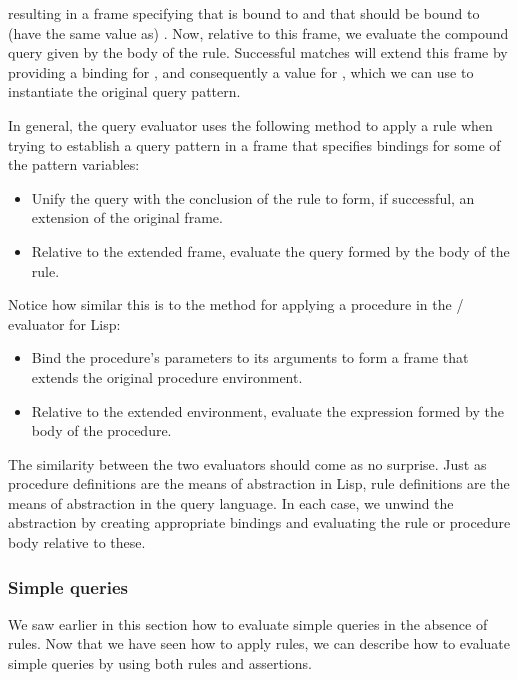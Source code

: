 \noindent
resulting in a frame specifying that  is bound to  and that  should be bound to (have the same value as)
.  Now, relative to this frame, we evaluate the compound query
given by the body of the rule.  Successful matches will extend this frame by
providing a binding for , and consequently a value for
, which we can use to instantiate the original query pattern.

In general, the query evaluator uses the following method to apply a rule when
trying to establish a query pattern in a frame that specifies bindings for some
of the pattern variables:

\begin{itemize}
\item
Unify the query with the conclusion of the rule to form, if successful, an
extension of the original frame.

\item
Relative to the extended frame, evaluate the query formed by the body of the
rule.
\end{itemize}

\noindent
Notice how similar this is to the method for applying a procedure in the
/ evaluator for Lisp:

\begin{itemize}
\item
Bind the procedure's parameters to its arguments to form a frame that extends
the original procedure environment.

\item
Relative to the extended environment, evaluate the expression formed by the
body of the procedure.
\end{itemize}

\noindent
The similarity between the two evaluators should come as no surprise.  Just as
procedure definitions are the means of abstraction in Lisp, rule definitions
are the means of abstraction in the query language.  In each case, we unwind
the abstraction by creating appropriate bindings and evaluating the rule or
procedure body relative to these.

\subsubsection*{Simple queries}

We saw earlier in this section how to evaluate simple queries in the absence of
rules.  Now that we have seen how to apply rules, we can describe how to
evaluate simple queries by using both rules and assertions.

